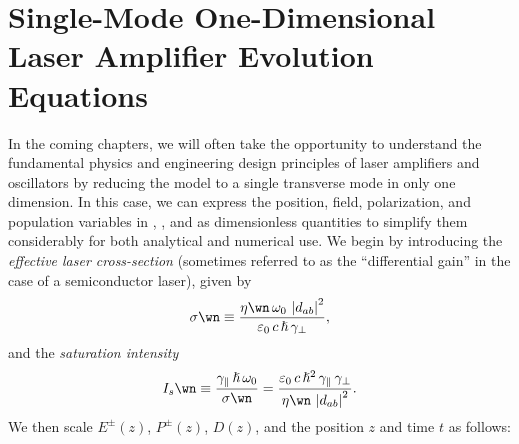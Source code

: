  \section{Single-Mode One-Dimensional Laser Amplifier Evolution Equations\label{sct:laser_amp_1d_pdes}}

In the coming chapters, we will often take the opportunity to understand the fundamental physics and engineering design principles of laser amplifiers and oscillators by reducing the model to a single transverse mode in only one dimension. In this case, we can express the position, field, polarization, and population variables in , , and  as dimensionless quantities to simplify them considerably for both analytical and numerical use. We begin by introducing the \emph{effective laser cross-section} (sometimes referred to as the ``differential gain'' in the case of a semiconductor laser), given by
 \begin{equation}\label{eqn:la1d_sigma_def}
\sigma\wn \equiv \frac{\eta\wn\, \omega_0\, \left|d_{a b}\right|^2}{\varepsilon_0\, c\, \hslash\, \gamma_\perp} ,
 \end{equation}
and the \emph{saturation intensity}
 \begin{equation}\label{eqn:la1d_isat_def}
I_s\wn \equiv \frac{\gamma_\parallel\, \hslash\, \omega_0}{\sigma\wn} = \frac{\varepsilon_0\, c\, \hslash^2\, \gamma_\parallel\, \gamma_\perp}{\eta\wn\, \left|d_{a b}\right|^2} .
 \end{equation}
We then scale $E^\pm(z)$, $P^\pm(z)$, $D(z)$, and the position $z$ and time $t$ as follows:
